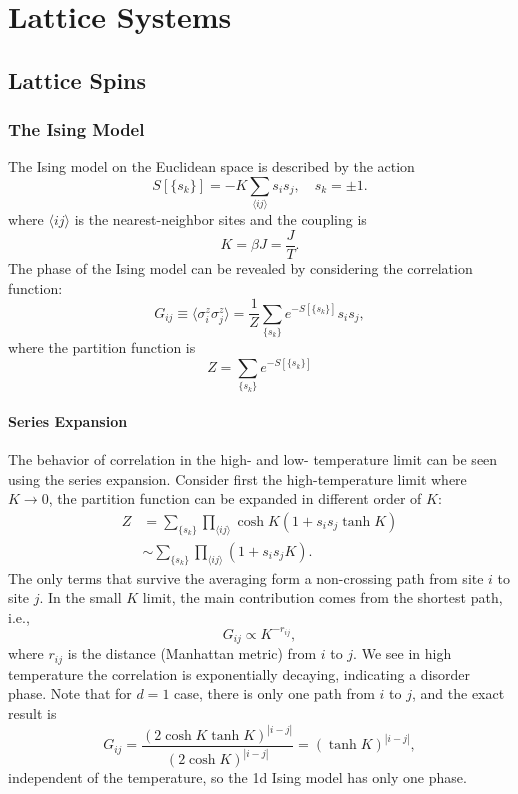 \chapter{Lattice Systems}

\section{Lattice Spins}

\subsection{The Ising Model}
The Ising model on the Euclidean space is described by the action
\begin{equation}
	S[\{s_k\}] = -K \sum_{\langle ij\rangle} s_i s_j,\quad s_k = \pm 1.
\end{equation}
where $\langle ij \rangle$ is the nearest-neighbor sites and the coupling is
\begin{equation}
	K = \beta J = \frac{J}{T}.
\end{equation}
The phase of the Ising model can be revealed by considering the correlation function:
\begin{equation}
	G_{ij} \equiv \langle \sigma_i^z \sigma_j^z\rangle
	= \frac{1}{Z} \sum_{\{s_k\}} e^{-S[\{s_k\}]} s_i s_j,
\end{equation}
where the partition function is
\begin{equation}
	Z = \sum_{\{s_k\}} e^{-S[\{s_k\}]}
\end{equation}


\subsubsection{Series Expansion}
The behavior of correlation in the high- and low- temperature limit can be seen using the series expansion.
Consider first the high-temperature limit where $K \rightarrow 0$, the partition function can be expanded in different order of $K$:
\begin{equation}
\begin{aligned}
	Z &= \sum_{\{s_k\}} \prod_{\langle ij\rangle} \cosh K (1 + s_i s_j \tanh K) \\
	&\sim \sum_{\{s_k\}} \prod_{\langle ij\rangle} (1 + s_i s_j K).
\end{aligned}
\end{equation}
The only terms that survive the averaging form a non-crossing path from site $i$ to site $j$.
In the small $K$ limit, the main contribution comes from the shortest path, i.e.,
\begin{equation}
	G_{ij} \propto K^{-r_{ij}},
\end{equation}
where $r_{ij}$ is the distance (Manhattan metric) from $i$ to $j$.
We see in high temperature the correlation is exponentially decaying, indicating a disorder phase.
Note that for $d=1$ case, there is only one path from $i$ to $j$, and the exact result is
\begin{equation}
	G_{ij} = \frac{(2\cosh K \tanh K)^{|i-j|}}{(2 \cosh K)^{|i-j|}}
	= \left(\tanh K\right)^{|i-j|},
\end{equation}
independent of the temperature, so the 1d Ising model has only one phase.

